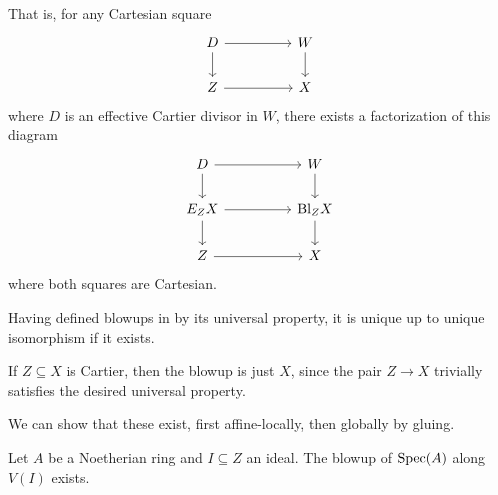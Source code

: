\begin{remark}
    That is, for any Cartesian square 
    $$%
    \begin{tikzcd}
        D && W \\
        Z && {X}
        \arrow[from=1-1, to=1-3]
        \arrow[from=1-1, to=2-1]
        \arrow[from=1-3, to=2-3]
        \arrow[from=2-1, to=2-3]
    \end{tikzcd}$$
    where $D$ is an effective Cartier divisor in $W$, there exists a factorization of this diagram 
    $$%
    \begin{tikzcd}
        D && W \\
        {E_{Z}X} && {\Bl_{Z}X} \\
        Z && X
        \arrow[from=1-1, to=1-3]
        \arrow[from=1-1, to=2-1]
        \arrow[from=1-3, to=2-3]
        \arrow[from=2-1, to=2-3]
        \arrow[from=2-1, to=3-1]
        \arrow[from=2-3, to=3-3]
        \arrow[from=3-1, to=3-3]
    \end{tikzcd}$$
    where both squares are Cartesian. 
\end{remark}
\begin{remark}
    Having defined blowups in  by its universal property, it is unique up to unique isomorphism if it exists. 
\end{remark}
\begin{remark}
    If $Z\subseteq X$ is Cartier, then the blowup is just $X$, since the pair $Z\to X$ trivially satisfies the desired universal property. 
\end{remark}
We can show that these exist, first affine-locally, then globally by gluing. 
\begin{lemma}\label{lem: blowup exists affine locally}
    Let $A$ be a Noetherian ring and $I\subseteq Z$ an ideal. The blowup of $\operatorname{Spec}(A)$ along $V(I)$ exists. 
\end{lemma}
